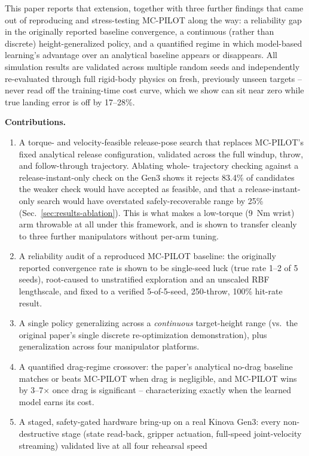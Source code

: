 \documentclass[conference]{IEEEtran}
\begin{document}
This paper reports that extension, together with three further findings
that came out of reproducing and stress-testing MC-PILOT along the way: a
reliability gap in the originally reported baseline convergence, a
continuous (rather than discrete) height-generalized policy, and a
quantified regime in which model-based learning's advantage over an
analytical baseline appears or disappears. All simulation results are
validated across multiple random seeds and independently re-evaluated
through full rigid-body physics on fresh, previously unseen targets --
never read off the training-time cost curve, which we show can sit near
zero while true landing error is off by 17--28\%.

\textbf{Contributions.}
\begin{enumerate}
\item A torque- and velocity-feasible release-pose search that replaces
MC-PILOT's fixed analytical release configuration, validated across the
full windup, throw, and follow-through trajectory. Ablating whole-
trajectory checking against a release-instant-only check on the Gen3 shows
it rejects 83.4\% of candidates the weaker check would have accepted as
feasible, and that a release-instant-only search would have overstated
safely-recoverable range by 25\% (Sec.~\ref{sec:results-ablation}). This
is what makes a low-torque (9~Nm wrist) arm throwable at all under this
framework, and is shown to transfer cleanly to three further manipulators
without per-arm tuning.
\item A reliability audit of a reproduced MC-PILOT baseline: the originally
reported convergence rate is shown to be single-seed luck (true rate 1--2
of 5 seeds), root-caused to unstratified exploration and an unscaled RBF
lengthscale, and fixed to a verified 5-of-5-seed, 250-throw, 100\%
hit-rate result.
\item A single policy generalizing across a \emph{continuous} target-height
range (vs.\ the original paper's single discrete re-optimization
demonstration), plus generalization across four manipulator platforms.
\item A quantified drag-regime crossover: the paper's analytical no-drag
baseline matches or beats MC-PILOT when drag is negligible, and MC-PILOT
wins by 3--7$\times$ once drag is significant -- characterizing exactly
when the learned model earns its cost.
\item A staged, safety-gated hardware bring-up on a real Kinova Gen3: every
non-destructive stage (state read-back, gripper actuation, full-speed
joint-velocity streaming) validated live at all four rehearsal speed

\end{enumerate}
\end{document}
